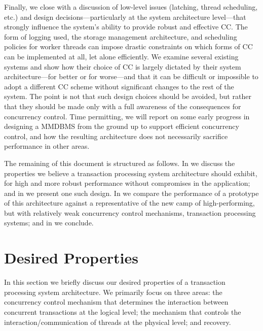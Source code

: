 Finally, we close with a discussion of low-level issues (latching, thread scheduling, etc.) and design decisions---particularly at the system architecture level---that strongly influence the system's ability to provide robust and effective CC. The form of logging used, the storage management architecture, and scheduling policies for worker threads can impose drastic constraints on which forms of CC can be implemented at all, let alone efficiently. We examine several existing systems and show how their choice of CC is largely dictated by their system architecture---for better or for worse---and that it can be difficult or impossible to adopt a different CC scheme without significant changes to the rest of the system. The point is not that such design choices should be avoided, but rather that they should be made only with a full awareness of the consequences for concurrency control. Time permitting, we will report on some early progress in designing a MMDBMS from the ground up to support efficient concurrency control, and how the resulting architecture does not necessarily sacrifice performance in other areas.

The remaining of this document is structured as follows. In  we discuss the properties we believe a transaction processing system architecture should exhibit, for high and more robust performance without compromises in the application; and in  we present one such design. In  we compare the performance of a prototype of this architecture against a representative of the new camp of high-performing, but with relatively weak concurrency control mechanisms, transaction processing systems; and in  we conclude. 

\section{Desired Properties}

In this section we briefly discuss our desired properties of a transaction processing system architecture. We primarily focus on three areas: the concurrency control mechanism that determines the interaction between concurrent transactions at the logical level; the mechanism that controls the interaction/communication of threads at the physical level; and recovery. 

